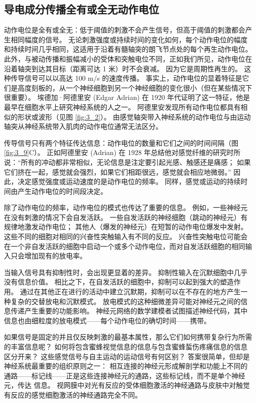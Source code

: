 \subsection{导电成分传播全有或全无动作电位}
动作电位是全有或全无：低于阈值的刺激不会产生信号，但高于阈值的刺激都会产生相同幅度的信号。 
无论刺激强度或持续时间的变化如何，每个动作电位的幅度和持续时间几乎相同，这适用于沿着有髓轴突的朗飞节点处的每个再生动作电位。 
此外，与被动传播和振幅减小的受体和突触电位不同，正如我们所见，动作电位在沿着轴突到达其目标（距离可达 1 米）时不会衰减。 
因为它是周期性再生的。 
这种传导信号可以以高达 100 m/s 的速度传播。 
事实上，动作电位的显着特征是它们是高度刻板的，从一个神经细胞到另一个神经细胞的变化很小（但在某些情况下很重要）。 
埃德加·阿德里安 (Edgar Adrian) 在 1920 年代证明了这一特征，他是最早在细胞水平上研究神经系统的人之一。 
阿德里安发现所有动作电位都具有相似的形状或波形（见图 \ref{fig:3_2}）。 
由感觉轴突带入神经系统的动作电位与由运动轴突从神经系统带入肌肉的动作电位通常无法区分。


传导信号只有两个特征传达信息：动作电位的数量和它们之间的时间间隔（图 \ref{fig:3_9}C）。 
正如阿德里安 (Adrian) 在 1928 年总结他对感觉纤维的研究时所说：“所有的冲动都非常相似，无论信息是注定要引起光感、触感还是痛感； 如果它们挤在一起，感觉就会强烈，如果它们相距很远，感觉就会相应地微弱。” 
因此，决定感觉强度或运动速度的是动作电位的频率。 
同样，感觉或运动的持续时间由产生动作电位的时间段决定。


除了动作电位的频率，动作电位的模式也传达了重要的信息。 
例如，一些神经元在没有刺激的情况下会自发活跃。 
一些自发活跃的神经细胞（跳动的神经元）有规律地激发动作电位； 其他人（爆发的神经元）在短暂的动作电位爆发中发射。 
这些不同的细胞对相同的兴奋性突触输入有不同的反应。 
兴奋性突触电位可能会在一个非自发活跃的细胞中启动一个或多个动作电位，而对自发活跃细胞的相同输入只会增加现有的放电率。


当输入信号具有抑制性时，会出现更显着的差异。 抑制性输入在沉默细胞中几乎没有信息价值。 
相比之下，在自发活跃的细胞中，抑制可以起到强大的塑造作用。 
通过在其他正在进行的活动中建立沉默期，抑制可以在不存在的地方产生一种复杂的交替放电和沉默模式。 
放电模式的这种细微差异可能对神经元之间的信息传递产生重要的功能影响。 
神经元网络的数学建模者试图描述神经代码，其中信息也由细粒度的放电模式——每个动作电位的确切时间——携带。


如果信号是固定的并且仅反映刺激的最基本属性，那么它们如何携带复杂行为所需的丰富信息呢？ 
如何将包含蜜蜂视觉信息的信息与包含蜜蜂蜇伤疼痛信息的信息区分开来？
这些感觉信号与自主运动的运动信号有何区别？ 
答案很简单，但却是神经系统最重要的组织原则之一：
相互连接的神经元形成解剖学和功能上不同的通路——标记线——正是这些连接神经元的通路，这些标记线，而不是单个神经元，传达 信息。 
视网膜中对光有反应的受体细胞激活的神经通路与皮肤中对触觉有反应的感觉细胞激活的神经通路完全不同。


